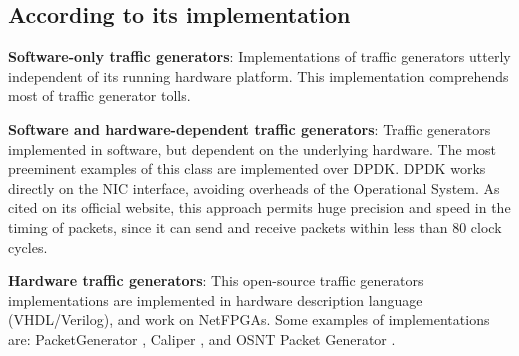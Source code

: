 \subsection{According to its implementation}

\textbf{Software-only traffic generators}: Implementations of traffic generators utterly independent of its running hardware platform. This implementation comprehends most of traffic generator tolls.

\textbf{Software and hardware-dependent traffic generators}: Traffic generators implemented in software, but dependent on the underlying hardware. The most preeminent examples of this class are implemented over DPDK\cite{web-dpdk}. DPDK works directly on the NIC interface, avoiding overheads of the Operational System. As cited on its official website, this approach permits huge precision and speed in the timing of packets, since it can send and receive packets within less than 80 clock cycles.

\textbf{Hardware traffic generators}: This open-source traffic generators implementations are implemented in hardware description language (VHDL/Verilog), and work on NetFPGAs. Some examples of implementations are: PacketGenerator \cite{web-netfpgapacketgenerator}, Caliper \cite{web-caliper}, and OSNT Packet Generator \cite{web-osnt}.


\renewcommand{\tabularxcolumn}[1]{>{\small}m{#1}}


